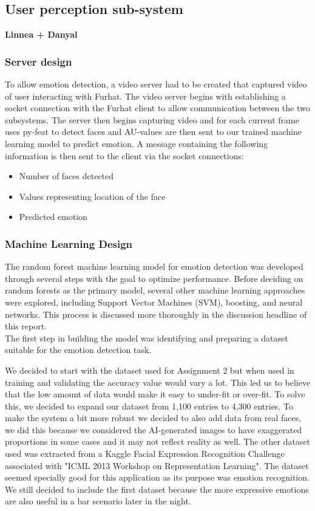 \documentclass[conference]{IEEEtran}
\begin{document}
\subsection{User perception sub-system}
\textbf{Linnea + Danyal}
\subsubsection{Server design}\label{sec:serverdesign}
To allow emotion detection, a video server had to be created that captured video of user interacting with Furhat. The video server begins with establishing a socket connection with the Furhat client to allow communication between the two subsystems. The server then begins capturing video and for each current frame uses py-feat to detect faces and AU-values are then sent to our trained machine learning model to predict emotion. A message containing the following information is then sent to the client via the socket connections:
\begin{itemize}
    \item Number of faces detected
    \item Values representing location of the face
    \item Predicted emotion
\end{itemize}
\subsubsection{Machine Learning Design}
The random forest machine learning model for emotion detection was developed through several steps with the goal to optimize performance. Before deciding on random forests as the primary model, several other machine learning approaches were explored, including Support Vector Machines (SVM), boosting, and neural networks. This process is discussed more thoroughly in the discussion headline of this report.\\ The first step in building the model was identifying and preparing a dataset suitable for the emotion detection task.

We decided to start with the dataset used for Assignment 2 but when used in training and validating the accuracy value would vary a lot. This led us to believe that the low amount of data would make it easy to under-fit or over-fit. To solve this, we decided to expand our dataset from 1,100 entries to 4,300 entries. To make the system a bit more robust we decided to also add data from real faces, we did this because we considered the AI-generated images to have exaggerated proportions in some cases and it may not reflect reality as well. The other dataset used was extracted from a Kaggle Facial Expression Recognition Challenge \cite{kaggle} associated with "ICML 2013 Workshop on Representation Learning". The dataset seemed specially good for this application as its purpose was emotion recognition.
We still decided to include the first dataset because the more expressive emotions are also useful in a bar scenario later in the night.
\end{document}
